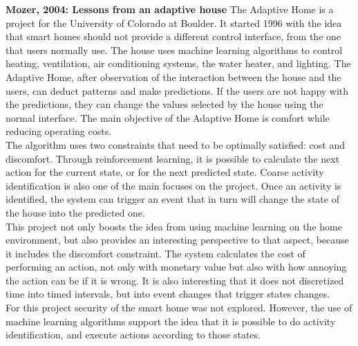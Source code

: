 \textbf{Mozer, 2004: Lessons from an adaptive house}\cite{mozer2004lessons}
The Adaptive Home is a project for the University of Colorado at Boulder. It started 1996 with the idea that smart homes should not provide a different control interface, from the one that users normally use. The house uses machine learning algorithms to control heating, ventilation, air conditioning systems, the water heater, and lighting. The Adaptive Home, after observation of the interaction between the house and the users, can deduct patterns and make predictions. If the users are not happy with the predictions, they can change the values selected by the house using the normal interface. The main objective of the Adaptive Home is comfort while reducing operating costs\cite{mozer2004lessons}.\\
The algorithm uses two constraints that need to be optimally satisfied: cost and discomfort. Through reinforcement learning, it is possible to calculate the next action for the current state, or for the next predicted state. Coarse activity identification is also one of the main focuses on the project. Once an activity is identified, the system can trigger an event that in turn will change the state of the house\cite{mozer2004lessons} into the predicted one.\\
This project not only boosts the idea from using machine learning on the home environment, but also provides an interesting perspective to that aspect, because it includes the discomfort constraint. The system calculates the cost of performing an action, not only with monetary value but also with how annoying the action can be if it is wrong. It is also interesting that it does not discretized time into timed intervals, but into event changes that trigger states changes.\\
For this project security of the smart home was not explored. However, the use of machine learning algorithms support the idea that it is possible to do activity identification, and execute actions according to those states. \\



